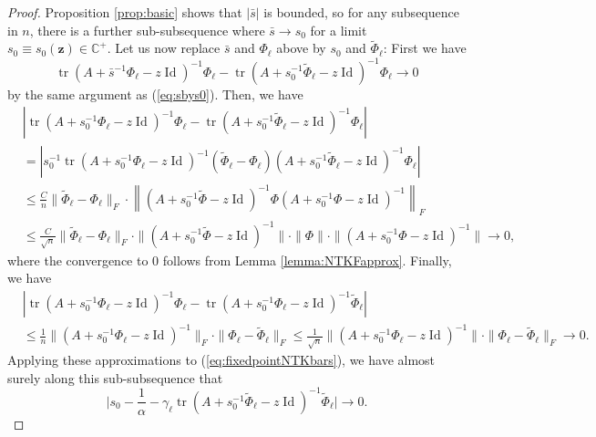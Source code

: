 \documentclass{article}
\theoremstyle{definition}
\newcommand{\C}{\mathbb{C}}
\newcommand{\Id}{\operatorname{Id}}
\newcommand{\tr}{\operatorname{tr}}
\newcommand{\z}{\mathbf{z}}
\newcommand{\1}{\mathbf{1}}
\begin{document}
\begin{proof}
Proposition \ref{prop:basic} shows that $|\bar{s}|$ is bounded, so for
any subsequence in $n$, there is a further sub-subsequence where $\bar{s} \to
s_0$ for a limit $s_0 \equiv s_0(\z) \in \C^+$. Let us now replace $\bar{s}$ and
$\Phi_\ell$ above by $s_0$ and $\tilde{\Phi}_\ell$: First we have
\[\tr \left(A+\bar{s}^{-1} \Phi_\ell-z\Id\right)^{-1}\Phi_\ell-\tr
\left(A+s_0^{-1} \tilde{\Phi}_\ell-z\Id\right)^{-1}\Phi_\ell
\to 0\]
by the same argument as (\ref{eq:sbys0}). Then, we have
\begin{align*}
&\left|\tr \left(A+s_0^{-1} \Phi_\ell-z\Id\right)^{-1}\Phi_\ell-\tr
\left(A+s_0^{-1} \tilde{\Phi}_\ell-z\Id\right)^{-1}\Phi_\ell\right|\\
&=\left|s_0^{-1}\tr\left(A+s_0^{-1} \Phi_\ell-z\Id\right)^{-1}
(\tilde{\Phi}_\ell-\Phi_\ell)\left(A+s_0^{-1} \tilde{\Phi}_\ell-z\Id\right)^{-1}
\Phi_\ell\right|\\
&\leq \frac{C}{n}\|\tilde{\Phi}_\ell-\Phi_\ell\|_F
\cdot \left\|(A+s_0^{-1} \tilde{\Phi}-z\Id)^{-1}
\Phi(A+s_0^{-1} \Phi-z\Id)^{-1}\right\|_F\\
&\leq \frac{C}{\sqrt{n}}
\|\tilde{\Phi}_\ell-\Phi_\ell\|_F
\cdot \|(A+s_0^{-1} \tilde{\Phi}-z\Id)^{-1}\|
\cdot \|\Phi\| \cdot \|(A+s_0^{-1} \Phi-z\Id)^{-1}\| \to 0,
\end{align*}
where the convergence to 0 follows from Lemma \ref{lemma:NTKFapprox}.
Finally, we have
\begin{align*}
&\left|\tr \left(A+s_0^{-1} \Phi_\ell-z\Id\right)^{-1}\Phi_\ell-\tr
\left(A+s_0^{-1} \Phi_\ell-z\Id\right)^{-1}\tilde{\Phi}_\ell\right|\\
&\leq \frac{1}{n}\|(A+s_0^{-1} \Phi_\ell-z\Id)^{-1}\|_F
\cdot \|\Phi_\ell-\tilde{\Phi}_\ell\|_F
\leq \frac{1}{\sqrt{n}}\|(A+s_0^{-1} \Phi_\ell-z\Id)^{-1}\|
\cdot \|\Phi_\ell-\tilde{\Phi}_\ell\|_F \to 0.
\end{align*}
Applying these approximations to (\ref{eq:fixedpointNTKbars}), we have almost
surely along this sub-subsequence that
\begin{equation}\label{eq:s0fixedfinal}
\Big|s_0-\frac{1}{\alpha}-\gamma_\ell
\tr (A+s_0^{-1}\tilde{\Phi}_\ell-z\Id)^{-1}\tilde{\Phi}_\ell\Big| \to 0.
\end{equation}


\end{proof}
\end{document}
